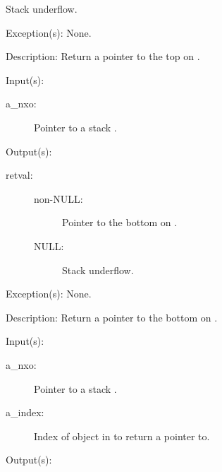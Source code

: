\begin{capi}
\begin{capilist}
\begin{description}
\begin{description}
				Stack underflow.
			\end{description}
		\end{description}
	\item[Exception(s): ] None.
	\item[Description: ]
		Return a pointer to the top  on .
	\end{capilist}
\label{nxo_stack_bget}
	\begin{capilist}
	\item[Input(s): ]
		\begin{description}\item[]
		\item[a\_nxo: ]
			Pointer to a stack .
		\end{description}
	\item[Output(s): ]
		\begin{description}\item[]
		\item[retval: ]
			\begin{description}\item[]
			\item[non-NULL: ]
				Pointer to the bottom  on
				.
			\item[NULL: ]
				Stack underflow.
			\end{description}
		\end{description}
	\item[Exception(s): ] None.
	\item[Description: ]
		Return a pointer to the bottom  on .
	\end{capilist}
\label{nxo_stack_nget}
	\begin{capilist}
	\item[Input(s): ]
		\begin{description}\item[]
		\item[a\_nxo: ]
			Pointer to a stack \classname{nxo}.
		\item[a\_index: ]
			Index of object in  to return a pointer to.
		\end{description}
	\item[Output(s): ]
		\begin{description}\item[]

\end{description}
\end{capilist}
\end{capi}
